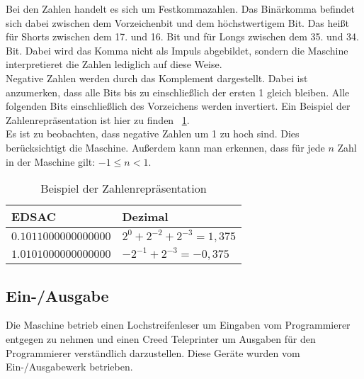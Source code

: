 \documentclass[12pt]{report}
\begin{document}
Bei den Zahlen handelt es sich um Festkommazahlen. Das Binärkomma befindet sich dabei zwischen dem Vorzeichenbit und dem höchstwertigem Bit. Das heißt für Shorts zwischen dem 17. und 16. Bit und für Longs zwischen dem 35. und 34. Bit. Dabei wird das Komma nicht als Impuls abgebildet, sondern die Maschine interpretieret die Zahlen lediglich auf diese Weise.\\

Negative Zahlen werden durch das Komplement dargestellt. Dabei ist anzumerken, dass alle Bits bis zu einschließlich der ersten 1 gleich bleiben. Alle folgenden Bits einschließlich des Vorzeichens werden invertiert. Ein Beispiel der Zahlenrepräsentation ist hier zu finden ~\ref{edsacnumex}.\\

Es ist zu beobachten, dass negative Zahlen um 1 zu hoch sind. Dies berücksichtigt die Maschine. Außerdem kann man erkennen, dass für jede $n$ Zahl in der Maschine gilt: $-1 \leq n < 1$.

\begin{table}
  \caption{Beispiel der Zahlenrepräsentation}
  \label{edsacnumex}
  \begin{tabular}{|l|l|}
    \hline
      EDSAC & Dezimal\\
    \hline
      $0.1011000000000000$ & $2^{0}+2^{-2}+2^{-3} = 1,375$\\
    \hline
      $1.0101000000000000$ & $-2^{-1}+2^{-3} = -0,375$\\
    \hline
  \end{tabular}
\end{table}

\subsection{Ein-/Ausgabe}
Die Maschine betrieb einen Lochstreifenleser um Eingaben vom Programmierer entgegen zu nehmen und einen Creed Teleprinter um Ausgaben für den Programmierer verständlich darzustellen. Diese Geräte wurden vom Ein-/Ausgabewerk betrieben.\\
\end{document}
